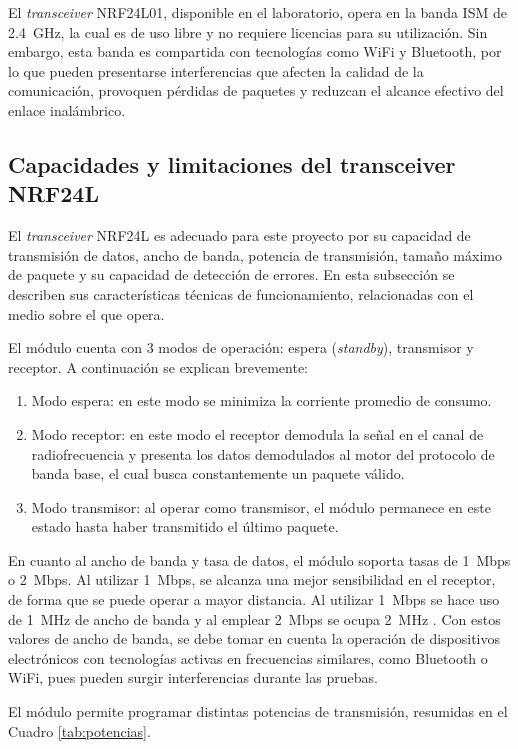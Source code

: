 El \textit{transceiver} NRF24L01, disponible en el laboratorio, opera en la banda ISM de \SI{2.4}{\giga\hertz}, la cual es de uso libre y no requiere licencias para su utilización.
Sin embargo, esta banda es compartida con tecnologías como WiFi y Bluetooth, por lo que pueden presentarse interferencias que afecten la calidad de la comunicación, provoquen pérdidas de paquetes y reduzcan el alcance efectivo del enlace inalámbrico.

\subsection{Capacidades y limitaciones del transceiver NRF24L}

El \textit{transceiver} NRF24L es adecuado para este proyecto por su capacidad de transmisión de datos, ancho de banda, potencia de transmisión, tamaño máximo de paquete y su capacidad de detección de errores.
En esta subsección se describen sus características técnicas de funcionamiento, relacionadas con el medio sobre el que opera.

El módulo cuenta con $3$ modos de operación: espera (\textit{standby}), transmisor y receptor.
A continuación se explican brevemente:
\begin{enumerate}
    \item Modo espera: en este modo se minimiza la corriente promedio de consumo.
    \item Modo receptor: en este modo el receptor demodula la señal en el canal de radiofrecuencia y presenta los datos demodulados al motor del protocolo de banda base, el cual busca constantemente un paquete válido.
    \item Modo transmisor: al operar como transmisor, el módulo permanece en este estado hasta haber transmitido el último paquete.
\end{enumerate}

En cuanto al ancho de banda y tasa de datos, el módulo soporta tasas de \SI{1}{Mbps} o \SI{2}{Mbps}.
Al utilizar \SI{1}{Mbps}, se alcanza una mejor sensibilidad en el receptor, de forma que se puede operar a mayor distancia.
Al utilizar \SI{1}{Mbps} se hace uso de \SI{1}{MHz} de ancho de banda y al emplear \SI{2}{Mbps} se ocupa \SI{2}{MHz} \cite{nordic}.
Con estos valores de ancho de banda, se debe tomar en cuenta la operación de dispositivos electrónicos con tecnologías activas en frecuencias similares, como Bluetooth o WiFi, pues pueden surgir interferencias durante las pruebas.

El módulo permite programar distintas potencias de transmisión, resumidas en el Cuadro \ref{tab:potencias}.

